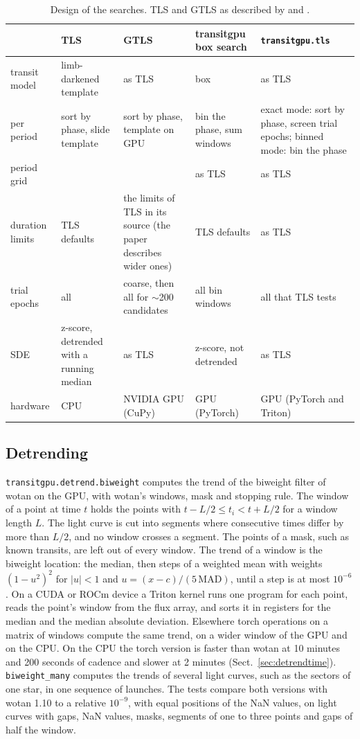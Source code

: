 \documentclass{aastex631}
\begin{document}
\begin{table}[htbp]
\centering
\caption{Design of the searches. TLS and GTLS as described by \citet{HippkeHeller2019} and \citet{Hu2026}.}\label{tab:design}
\small
\begin{tabular}{R{2.6cm}R{2.9cm}R{2.9cm}R{2.9cm}R{2.9cm}}
\toprule
 & TLS & GTLS & transitgpu box search & \texttt{transitgpu.tls} \\
\midrule
transit model & limb-darkened template & as TLS & box & as TLS \\
per period & sort by phase, slide template & sort by phase, template on GPU & bin the phase, sum windows & exact mode: sort by phase, screen trial epochs; binned mode: bin the phase \\
period grid & \citet{Ofir2014} & \citet{Ofir2014} & as TLS & as TLS \\
duration limits & TLS defaults & the limits of TLS in its source (the paper describes wider ones) & TLS defaults & as TLS \\
trial epochs & all & coarse, then all for $\sim$200 candidates & all bin windows & all that TLS tests \\
SDE & z-score, detrended with a running median & as TLS & z-score, not detrended & as TLS \\
hardware & CPU & NVIDIA GPU (CuPy) & GPU (PyTorch) & GPU (PyTorch and Triton) \\
\bottomrule
\end{tabular}
\end{table}

\subsection{Detrending}\label{sec:detrend}
\texttt{transitgpu.detrend.biweight} computes the trend of the biweight filter of wotan \citep{Hippke2019wotan} on the GPU, with wotan's windows, mask and stopping rule. The window of a point at time $t$ holds the points with $t - L/2 \le t_i < t + L/2$ for a window length $L$. The light curve is cut into segments where consecutive times differ by more than $L/2$, and no window crosses a segment. The points of a mask, such as known transits, are left out of every window. The trend of a window is the biweight location: the median, then steps of a weighted mean with weights $(1-u^2)^2$ for $|u|<1$ and $u = (x - c)/(5\,\mathrm{MAD})$, until a step is at most $10^{-6}$. On a CUDA or ROCm device a Triton kernel runs one program for each point, reads the point's window from the flux array, and sorts it in registers for the median and the median absolute deviation. Elsewhere torch operations on a matrix of windows compute the same trend, on a wider window of the GPU and on the CPU. On the CPU the torch version is faster than wotan at 10 minutes and 200 seconds of cadence and slower at 2 minutes (Sect.~\ref{sec:detrendtime}). \texttt{biweight\_many} computes the trends of several light curves, such as the sectors of one star, in one sequence of launches. The tests compare both versions with wotan 1.10 to a relative $10^{-9}$, with equal positions of the NaN values, on light curves with gaps, NaN values, masks, segments of one to three points and gaps of half the window.
\end{document}
